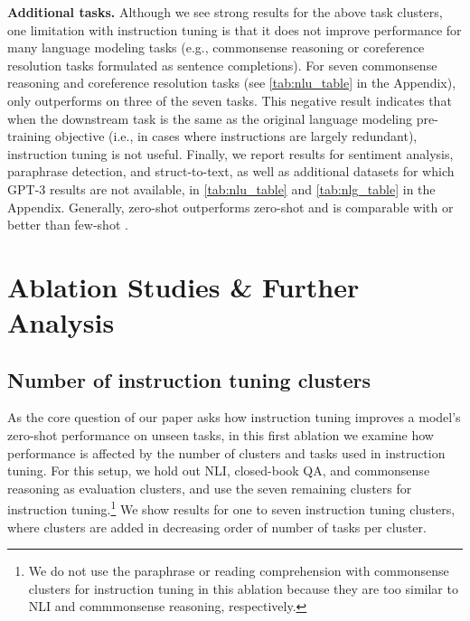 \newcommand{\explainwewin}[0]{The triangle \textcolor{jweigreen}{\scriptsize$\blacktriangle$} indicates improvement over few-shot GPT-3.}
\newcommand{\explainwekindawin}[0]{The up-arrow \textcolor{jweigreen}{\scriptsize$\uparrow$} indicates improvement only over zero-shot GPT-3.}
\newcommand{\gptvala}[3]{& #1 & #2 {\tiny #3}}
\newcommand{\baselmvala}[3]{& #1 & #2 {\tiny [#3]}}
\newcommand{\flanvala}[3]{& #1{\tiny $\pm$#2} & #3}
\newcommand{\na}[0]{\makecell[c]{--}}
\newcommand{\explainkt}[0]{{\scriptsize $[k]$} indicates the number of few-shot exemplars. {\scriptsize \#$t$} indicates the number of templates that FLAN is evaluated on.}
\newcommand{\fewk}[1]{{\tiny [#1]}}
 
 

\textbf{Additional tasks.}
Although we see strong results for the above task clusters, one limitation with instruction tuning is that it does not improve performance for many language modeling tasks (e.g., commonsense reasoning or coreference resolution tasks formulated as sentence completions).
For seven commonsense reasoning and coreference resolution tasks (see \cref{tab:nlu_table} in the Appendix), \flan{} only outperforms \baselm{} on three of the seven tasks.
This negative result indicates that when the downstream task is the same as the original language modeling pre-training objective (i.e., in cases where instructions are largely redundant), instruction tuning is not useful.
Finally, we report results for sentiment analysis, paraphrase detection, and struct-to-text, as well as additional datasets for which GPT-3 results are not available, in \cref{tab:nlu_table} and \cref{tab:nlg_table} in the Appendix.
Generally, zero-shot \flan{} outperforms zero-shot \baselm{} and is comparable with or better than few-shot \baselm{}.

\section{Ablation Studies \& Further Analysis}

\subsection{Number of instruction tuning clusters}\label{subsec:finetuning_clusters}
As the core question of our paper asks how instruction tuning improves a model's zero-shot performance on unseen tasks, in this first ablation we examine how performance is affected by the number of clusters and tasks used in instruction tuning.
For this setup, we hold out NLI, closed-book QA, and commonsense reasoning as evaluation clusters, and use the seven remaining clusters for instruction tuning.\footnote{We do not use the paraphrase or reading comprehension with commonsense clusters for instruction tuning in this ablation because they are too similar to NLI and commmonsense reasoning, respectively.}
We show results for one to seven instruction tuning clusters, where clusters are added in decreasing order of number of tasks per cluster.

